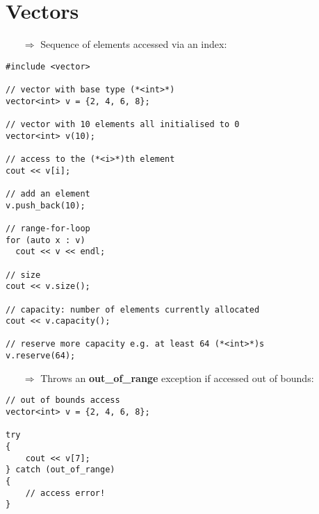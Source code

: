 \documentclass[10pt]{article}
\begin{document}
\section{Vectors}
\small
\begin{enumerate}
\item[$\Rightarrow$] Sequence of elements accessed via an index:
\end{enumerate}
\begin{lstlisting}
#include <vector>

// vector with base type (*<int>*)
vector<int> v = {2, 4, 6, 8};

// vector with 10 elements all initialised to 0
vector<int> v(10);

// access to the (*<i>*)th element
cout << v[i];

// add an element
v.push_back(10);

// range-for-loop
for (auto x : v)
  cout << v << endl;

// size
cout << v.size();

// capacity: number of elements currently allocated
cout << v.capacity();

// reserve more capacity e.g. at least 64 (*<int>*)s
v.reserve(64);
\end{lstlisting}
\begin{enumerate}
\item[$\Rightarrow$] Throws an \textbf{out\_of\_range} exception if accessed out of bounds:
\end{enumerate}
\begin{lstlisting}
// out of bounds access
vector<int> v = {2, 4, 6, 8};

try
{
    cout << v[7];
} catch (out_of_range)
{
    // access error!
}
\end{lstlisting}
%
%
\end{document}
